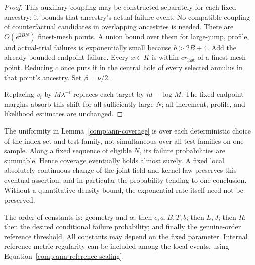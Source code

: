 \begin{proof}
This auxiliary coupling may be constructed separately for each fixed
ancestry: it bounds that ancestry's actual failure event.  No compatible
coupling of counterfactual candidates in overlapping ancestries is
needed.  There are $O(e^{2BN})$ finest-mesh points.  A union bound over
them for large-jump, profile, and actual-trial failures is exponentially
small because $b>2B+4$.  Add the already bounded endpoint failure.
Every $x\in K$ is within $cr_{\mathrm{last}}$ of a finest-mesh point.
Reducing $c$ once puts it in the central hole of every selected annulus
in that point's ancestry.  Set $\beta=\nu/2$.

Replacing $v_i$ by $M\lambda^{-i}$ replaces each target by $id-\log M$.
The fixed endpoint margins absorb this shift for all sufficiently large
$N$; all increment, profile, and likelihood estimates are unchanged.
\end{proof}

The uniformity in Lemma~\ref{comp:ann-coverage} is over each deterministic
choice of the index set and test family, not simultaneous over all test
families on one sample.  Along a fixed sequence of eligible $N$, its
failure probabilities are summable.  Hence coverage eventually holds
almost surely.  A fixed local absolutely continuous change of the joint
field-and-kernel law preserves this eventual assertion, and in
particular the probability-tending-to-one conclusion.  Without a
quantitative density bound, the exponential rate itself need not be
preserved.

The order of constants is: geometry and $\alpha$; then
$\epsilon,a,B,T,b$; then $L,J$; then $R$; then the desired conditional
failure probability; and finally the genuine-order reference threshold.
All constants may depend on the fixed parameter.  Internal reference
metric regularity can be included among the local events, using
Equation~\eqref{comp:ann-reference-scaling}.
